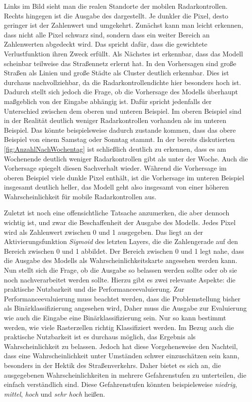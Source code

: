 Links im Bild sieht man die realen Standorte der mobilen Radarkontrollen.
Rechts hingegen ist die Ausgabe des  dargestellt.
Je dunkler die Pixel, desto geringer ist der Zahlenwert und umgekehrt.
Zunächst kann man leicht erkennen, dass nicht alle Pixel schwarz sind, sondern dass ein weiter Bereich an Zahlenwerten abgedeckt wird.
Das spricht dafür, dass die gewichtete Verlustfunktion ihren Zweck erfüllt.
Als Nächstes ist erkennbar, dass das Modell scheinbar teilweise das Straßennetz erlernt hat.
In den Vorhersagen sind große Straßen als Linien und große Städte als Cluster deutlich erkennbar.
Dies ist durchaus nachvollziehbar, da die Radarkontrollendichte hier besonders hoch ist.
Dadurch stellt sich jedoch die Frage, ob die Vorhersage des Modells überhaupt maßgeblich von der Eingabe abhängig ist.
Dafür spricht jedenfalls der Unterschied zwischen dem oberen und unteren Beispiel.
Im oberen Beispiel sind in der Realität deutlich weniger Radarkontrollen vorhanden als im unteren Beispiel.
Das könnte beispielsweise dadurch zustande kommen, dass das obere Beispiel von einem Samstag oder Sonntag stammt.
In der bereits diskutierten \autoref{fig:AnzahlNachWochentag} ist schließlich deutlich zu erkennen, dass es am Wochenende deutlich weniger Radarkontrollen gibt als unter der Woche.
Auch die Vorhersage spiegelt diesen Sachverhalt wieder.
Während die Vorhersage im oberen Beispiel viele dunkle Pixel enthält, ist die Vorhersage im unteren Beispiel insgesamt deutlich heller, das Modell geht also insgesamt von einer höheren Wahrscheinlichkeit für mobile Radarkontrollen aus.

Zuletzt ist noch eine offensichtliche Tatsache anzumerken, die aber dennoch wichtig ist, und zwar die Beschaffenheit der Ausgabe des Modells.
Jedes Pixel wird als Zahlenwert zwischen 0 und 1 ausgegeben.
Das liegt an der Aktivierungsfunktion \emph{Sigmoid} des letzten Layers, die die Zahlengerade auf den Bereich zwischen 0 und 1 abbildet.
Der Bereich zwischen 0 und 1 legt nahe, dass die Ausgabe des Modells als Wahrscheinlichkeitskarte angesehen werden kann.
Nun stellt sich die Frage, ob die Ausgabe so belassen werden sollte oder ob sie noch nachverarbeitet werden sollte.
Hierzu gibt es zwei relevante Aspekte: die praktische Nutzbarkeit und die Performanceevaluierung.
Zur Performanceevaluierung muss beachtet werden, dass die Problemstellung bisher als Binärklassifizierung angesehen wird,
Daher muss die Ausgabe zur Evaluierung wie auch die Eingabe eine Binärklassifizierung sein.
Nur so kann bestimmt werden, wie viele Rasterzellen richtig Klassifiziert werden.
Im Bezug auch die praktische Nutzbarkeit ist es durchaus möglich, das Ergebnis als Wahrscheinlichkeit zu belassen.
Jedoch hat diese Vorgehensweise den Nachteil, dass eine Wahrscheinlichkeit unter Umständen schwer einzuschätzen sein kann, besonders in der Hektik des Straßenverkehrs.
Daher bietet es sich an, die ausgegebenen Wahrscheinlichkeiten in mehrere Gefahrenstufen zu unterteilen, die einfach verständlich sind.
Diese Gefahrenstufen könnten beispielsweise \emph{niedrig}, \emph{mittel}, \emph{hoch} und \emph{sehr hoch} heißen.

